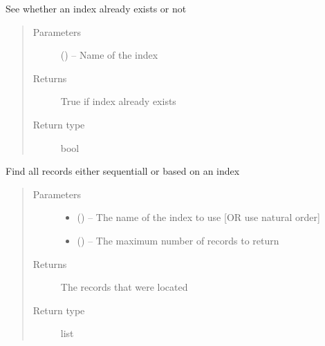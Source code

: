 \documentclass[letterpaper,10pt,english]{sphinxmanual}
\begin{document}
\begin{fulllineitems}

\begin{fulllineitems}
\label{\detokenize{index:mamba.Table.exists}}
See whether an index already exists or not
\begin{quote}\begin{description}
\item[{Parameters}] \leavevmode
{} () -- Name of the index

\item[{Returns}] \leavevmode
True if index already exists

\item[{Return type}] \leavevmode
bool

\end{description}\end{quote}

\end{fulllineitems}


\begin{fulllineitems}
\label{\detokenize{index:mamba.Table.find}}
Find all records either sequentiall or based on an index
\begin{quote}\begin{description}
\item[{Parameters}] \leavevmode\begin{itemize}
\item {} 
 () -- The name of the index to use {[}OR use natural order{]}

\item {} 
 () -- The maximum number of records to return

\end{itemize}

\item[{Returns}] \leavevmode
The records that were located

\item[{Return type}] \leavevmode
list

\end{description}\end{quote}


\end{fulllineitems}
\end{fulllineitems}
\end{document}
